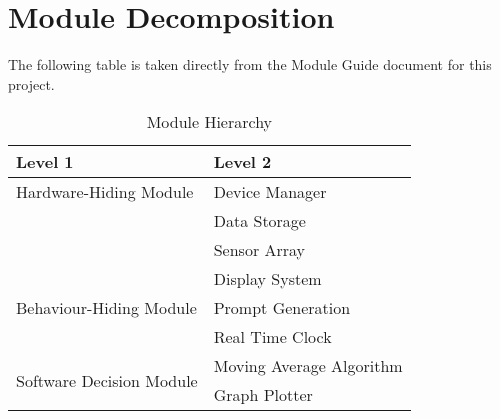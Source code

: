 \documentclass[12pt, titlepage]{article}
\begin{document}
\section{Module Decomposition}

The following table is taken directly from the Module Guide document for this project.
\begin{table}[h!]
  \centering
  \begin{tabular}{p{} p{}}
    \toprule
    \textbf{Level 1}                                      & \textbf{Level 2}         \\
    \midrule

    {Hardware-Hiding Module}                              & Device Manager           \\
                                                          & Data Storage             \\
                                                          & Sensor Array             \\

    \midrule

    \multirow{3}{0.3\textwidth}{Behaviour-Hiding Module}  & Display System           \\
                                                          & Prompt Generation        \\
                                                          & Real Time Clock          \\


    \midrule

    \multirow{3}{0.3\textwidth}{Software Decision Module} & Moving Average Algorithm \\
                                                          & Graph Plotter            \\

    \bottomrule
  \end{tabular}
  \caption{Module Hierarchy}
  \label{TblMH}
\end{table}

\newpage
\end{document}
